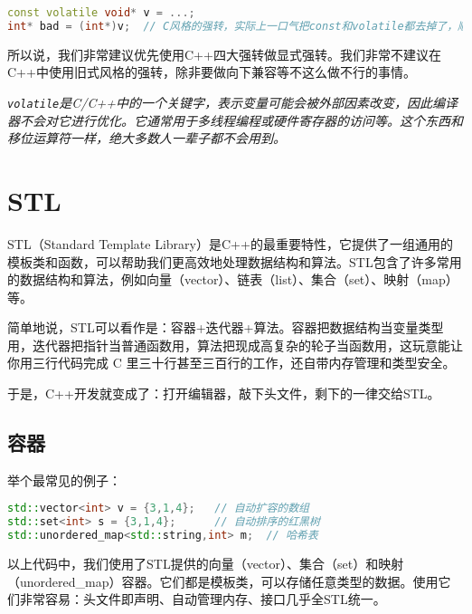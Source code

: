 \documentclass[../main.tex]{subfiles}
\begin{document}
\begin{lstlisting}[language=C++]
const volatile void* v = ...;
int* bad = (int*)v;  // C风格的强转，实际上一口气把const和volatile都去掉了，顺便做了个按位重解释
\end{lstlisting}

所以说，我们非常建议优先使用C++四大强转做显式强转。我们非常不建议在C++中使用旧式风格的强转，除非要做向下兼容等不这么做不行的事情。

\emph{
  \texttt{volatile}是C/C++中的一个关键字，表示变量可能会被外部因素改变，因此编译器不会对它进行优化。它通常用于多线程编程或硬件寄存器的访问等。这个东西和移位运算符一样，绝大多数人一辈子都不会用到。
}

\section{STL}

STL（Standard Template Library）是C++的最重要特性，它提供了一组通用的模板类和函数，可以帮助我们更高效地处理数据结构和算法。STL包含了许多常用的数据结构和算法，例如向量（vector）、链表（list）、集合（set）、映射（map）等。

简单地说，STL可以看作是：容器+迭代器+算法。容器把数据结构当变量类型用，迭代器把指针当普通函数用，算法把现成高复杂的轮子当函数用，这玩意能让你用三行代码完成 C 里三十行甚至三百行的工作，还自带内存管理和类型安全。

于是，C++开发就变成了：打开编辑器，敲下头文件，剩下的一律交给STL。

\subsection{容器}

举个最常见的例子：
\begin{lstlisting}[language=C++]
std::vector<int> v = {3,1,4};   // 自动扩容的数组
std::set<int> s = {3,1,4};      // 自动排序的红黑树
std::unordered_map<std::string,int> m;  // 哈希表
\end{lstlisting}
以上代码中，我们使用了STL提供的向量（vector）、集合（set）和映射（unordered\_map）容器。它们都是模板类，可以存储任意类型的数据。使用它们非常容易：头文件即声明、自动管理内存、接口几乎全STL统一。
\end{document}
